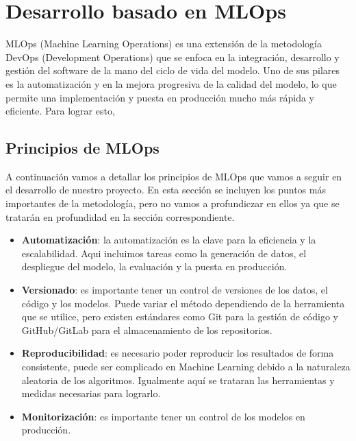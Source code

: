 \section{Desarrollo basado en MLOps}
    MLOps (Machine Learning Operations) es una extensión de la metodología DevOps (Development Operations)
    que se enfoca en la integración, desarrollo y gestión del software de la mano del ciclo de vida del modelo.
    Uno de sus pilares es la automatización y en la mejora progresiva de la calidad del modelo, 
    lo que permite una implementación y puesta en producción mucho más rápida y eficiente. Para lograr esto,

    \subsection{Principios de MLOps}
    A continuación vamos a detallar los principios de MLOps que vamos a seguir en el desarrollo de nuestro proyecto.
    En esta sección se incluyen los puntos más importantes de la metodología, pero no vamos a profundiczar en ellos
    ya que se tratarán en profundidad en la sección correspondiente.
    
    \begin{itemize}
        \item \textbf{Automatización}: la automatización es la clave para la eficiencia y la escalabilidad.
        Aqui incluimos tareas como la generación de datos, el despliegue del modelo, la evaluación y 
        la puesta en producción. 
        \item \textbf{Versionado}: es importante tener un control de versiones de los datos, el código y los modelos. 
        Puede variar el método dependiendo de la herramienta que se utilice, pero existen estándares como Git para la gestión
        de código y GitHub/GitLab para el almacenamiento de los repositorios.
        \item \textbf{Reproducibilidad}: es necesario poder reproducir los resultados de forma consistente, puede ser
        complicado en Machine Learning debido a la naturaleza aleatoria de los algoritmos. Igualmente aquí se trataran
        las herramientas y medidas necesarias para lograrlo.
        \item \textbf{Monitorización}: es importante tener un control de los modelos en producción.
    \end{itemize}
    
    

\pagebreak